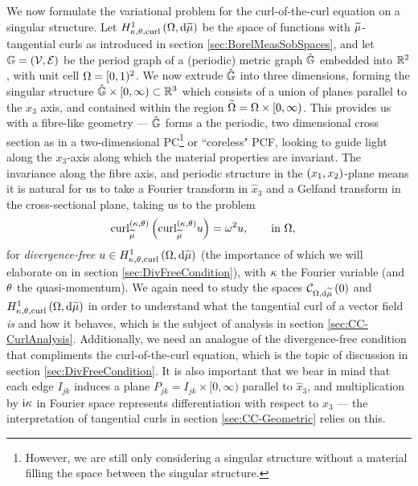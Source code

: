 We now formulate the variational problem for the curl-of-the-curl equation on a singular structure.
Let $H^1_{\kappa,\theta,\mathrm{curl}}\left( \Omega, \mathrm{d}\widetilde{\mu} \right)$ be the space of functions with $\widetilde{\mu}$-tangential curls as introduced in section \ref{sec:BorelMeasSobSpaces}, and let $\mathbb{G}=\left( \mathcal{V},\mathcal{E} \right)$ be the period graph of a (periodic) metric graph $\hat{\mathbb{G}}$ embedded into $\mathbb{R}^2$, with unit cell $\Omega=[0,1)^2$.
We now extrude $\hat{\mathbb{G}}$ into three dimensions, forming the singular structure $\hat{\mathbb{G}}\times[0,\infty)\subset\mathbb{R}^3$ which consists of a union of planes parallel to the $x_3$ axis, and contained within the region $\widetilde{\Omega}=\Omega\times[0,\infty)$.
This provides us with a fibre-like geometry --- $\hat{\mathbb{G}}$ forms a the periodic, two dimensional cross section as in a two-dimensional PC\footnote{However, we are still only considering a singular structure without a material filling the space between the singular structure.} or ``coreless" PCF, looking to guide light along the $x_3$-axis along which the material properties are invariant.
The invariance along the fibre axis, and periodic structure in the $\left( x_1,x_2 \right)$-plane means it is natural for us to take a Fourier transform in $\widehat{x}_3$ and a Gelfand transform in the cross-sectional plane, taking us to the problem
\begin{align} \label{eq:SingularCurlEquation}
	\mathrm{curl}_{\widetilde{\mu}}^{\left( \kappa, \theta \right)}\left(  \mathrm{curl}_{\widetilde{\mu}}^{\left( \kappa, \theta \right)}u  \right) &= \omega^2 u,
	\qquad \text{in } \Omega,
\end{align}
for \emph{divergence-free} $u\in H^1_{\kappa,\theta,\mathrm{curl}}\left( \Omega, \mathrm{d}\widetilde{\mu} \right)$ (the importance of which we will elaborate on in section \ref{sec:DivFreeCondition}), with $\kappa$ the Fourier variable (and $\theta$ the quasi-momentum).
We again need to study the spaces $\mathcal{C}_{ \Omega, \mathrm{d}\widetilde{\mu}}\left( 0 \right)$ and $H^1_{\kappa,\theta,\mathrm{curl}}\left( \Omega, \mathrm{d}\widetilde{\mu} \right)$ in order to understand what the tangential curl of a vector field \emph{is} and how it behaves, which is the subject of analysis in section \ref{sec:CC-CurlAnalysis}.
Additionally, we need an analogue of the divergence-free condition that compliments the curl-of-the-curl equation, which is the topic of discussion in section \ref{sec:DivFreeCondition}.
It is also important that we bear in mind that each edge $I_{jk}$ induces a plane $P_{jk} = I_{jk}\times[0,\infty)$ parallel to $\widehat{x}_3$, and multiplication by $\mathrm{i}\kappa$ in Fourier space represents differentiation with respect to $x_3$ --- the interpretation of tangential curls in section \ref{sec:CC-Geometric} relies on this.

